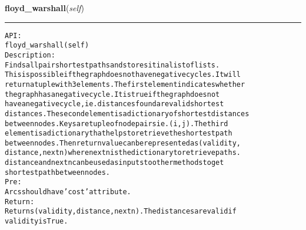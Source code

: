 \hspace{.8\funcindent}\begin{boxedminipage}{\funcwidth}

    \raggedright \textbf{floyd\_warshall}(\textit{self})

    \vspace{-1.5ex}

    \rule{\textwidth}{0.5\fboxrule}
\setlength{\parskip}{2ex}
\begin{alltt}

API:
    floyd\_warshall(self)
Description:
    Finds all pair shortest paths and stores it in a list of lists.
    This is possible if the graph does not have negative cycles. It will
    return a tuple with 3 elements. The first element indicates whether
    the graph has a negative cycle. It is true if the graph does not
    have a negative cycle, ie. distances found are valid shortest
    distances. The second element is a dictionary of shortest distances
    between nodes. Keys are tuple of node pairs ie. (i,j). The third
    element is a dictionary that helps to retrieve the shortest path
    between nodes. Then return value can be represented as (validity,
    distance, nextn) where nextn is the dictionary to retrieve paths.
    distance and nextn can be used as inputs to other methods to get
    shortest path between nodes.
Pre:
    Arcs should have 'cost' attribute.
Return:
    Returns (validity, distance, nextn). The distances are valid if
    validity is True.
\end{alltt}

\setlength{\parskip}{1ex}
    \end{boxedminipage}

    \label{coinor:gimpy:graph:Graph:floyd_warshall_get_cycle}

    \vspace{0.5ex}

